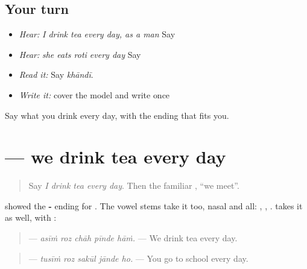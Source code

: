 \subsection*{Your turn}
\begin{itemize}
\raggedright
  \item \emph{Hear:} \emph{I drink tea every day, as a man} Say \textbf{    }
  \item \emph{Hear:} \emph{she eats roti every day} Say \textbf{    }
  \item \emph{Read it:} \textbf{} Say \emph{khāndī}.
  \item \emph{Write it:} cover the model and write \textbf{} once
\end{itemize}

\begin{tcolorbox}[breakable,colback=teal!4,colframe=teal!35!black,title={Before you move on}]
Say what you drink every day, with the ending that fits you.
\end{tcolorbox}
\section[\texorpdfstring{\pa{ਅਸੀਂ} \pa{ਰੋਜ਼} \pa{ਚਾਹ} \pa{ਪੀਂਦੇ} \pa{ਹਾਂ।} (asīṁ roz chāh …)}{ਅਸੀਂ ਰੋਜ਼ ਚਾਹ ਪੀਂਦੇ ਹਾਂ। (asīṁ roz chāh …)}]{     — we drink tea every day}

\label{lesson:PA-C211-tea-every-day}



\begin{quote}
Say \emph{I drink tea every day}. Then the familiar \textbf{  }, \textquotedblleft{}we meet\textquotedblright{}.
\end{quote}

\begin{grammarlens}[title={Grammar Lens: -\pa{ਦੇ} for more than one}]
\textbf{} showed the \textbf{-} ending for \textbf{}. The vowel stems take it too, nasal and all: \textbf{}, \textbf{}, \textbf{}. \textbf{} takes it as well, with \textbf{}:

\begin{quote}
\textbf{    } — \emph{asīṁ roz chāh pīnde hāṁ.} — We drink tea every day.
\end{quote}

\begin{quote}
\textbf{    } — \emph{tusīṁ roz sakūl jānde ho.} — You go to school every day.
\end{quote}
\end{grammarlens}

